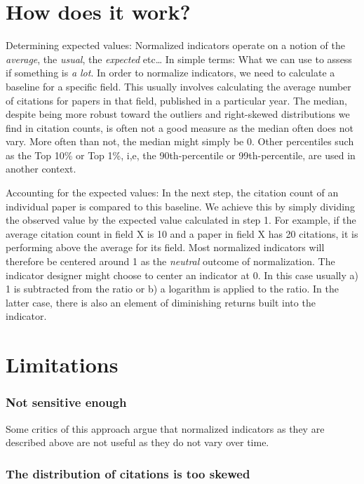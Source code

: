 \documentclass[
  letterpaper,
]{scrreprt}
\begin{document}
\section{How does it work?}\label{how-does-it-work-4}

Determining expected values: Normalized indicators operate on a notion
of the \emph{average}, the \emph{usual}, the \emph{expected} etc\ldots{}
In simple terms: What we can use to assess if something is \emph{a lot}.
In order to normalize indicators, we need to calculate a baseline for a
specific field. This usually involves calculating the average number of
citations for papers in that field, published in a particular year. The
median, despite being more robust toward the outliers and right-skewed
distributions we find in citation counts, is often not a good measure as
the median often does not vary. More often than not, the median might
simply be 0. Other percentiles such as the Top 10\% or Top 1\%, i,e, the
90th-percentile or 99th-percentile, are used in another context.

Accounting for the expected values: In the next step, the citation count
of an individual paper is compared to this baseline. We achieve this by
simply dividing the observed value by the expected value calculated in
step 1. For example, if the average citation count in field X is 10 and
a paper in field X has 20 citations, it is performing above the average
for its field. Most normalized indicators will therefore be centered
around 1 as the \emph{neutral} outcome of normalization. The indicator
designer might choose to center an indicator at 0. In this case usually
a) 1 is subtracted from the ratio or b) a logarithm is applied to the
ratio. In the latter case, there is also an element of diminishing
returns built into the indicator.

\section{Limitations}\label{limitations-6}

\subsubsection{Not sensitive enough}\label{not-sensitive-enough}

Some critics of this approach argue that normalized indicators as they
are described above are not useful as they do not vary over time.

\subsubsection{The distribution of citations is too
skewed}\label{the-distribution-of-citations-is-too-skewed}
\end{document}
